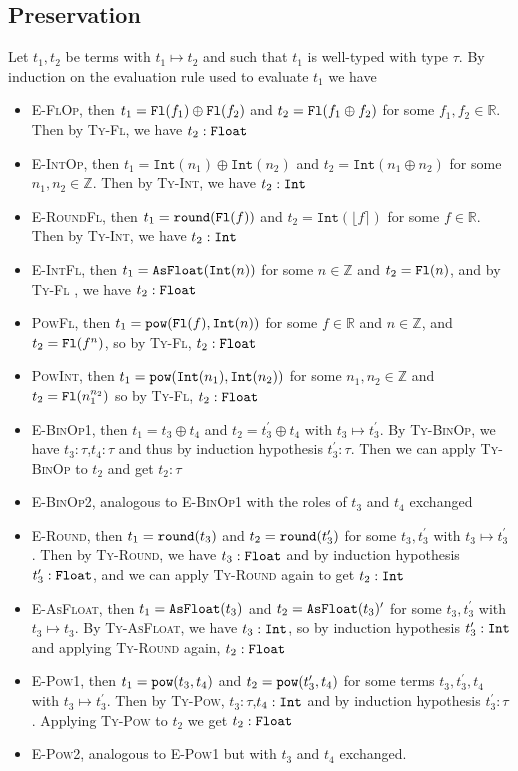 \documentclass{article}
\newcommand{\round}[1]{\ensuremath\mathtt{round}(#1)}
\newcommand{\fl}[1]{\ensuremath\mathtt{Fl}(#1)}
\newcommand{\nat}[1]{\ensuremath{\mathtt{Int}(#1)}}
\newcommand{\tofloat}[1]{\ensuremath\mathtt{AsFloat}(#1)}
\newcommand{\tyint}{\ensuremath\mathtt{Int}}
\newcommand{\tyfloat}{\ensuremath\mathtt{Float}}
\newcommand{\pow}[2]{\ensuremath\mathtt{pow}(#1,#2)}
\begin{document}
\subsection*{Preservation}
Let $t_1,t_2$ be terms with $t_1\mapsto t_2$ and such that $t_1$ is well-typed with type $\tau$. By induction on the evaluation rule used to evaluate $t_1$ we have 
\begin{itemize}
\item \textsc{E-FlOp}, then $t_1 = \fl{f_1} \oplus \fl{f_2}$ and $t_2 = \fl{f_1\oplus f_2}$ for some $f_1,f_2\in\mathbb{R}$. Then by \textsc{Ty-Fl}, we have $t_2:\tyfloat$
\item \textsc{E-IntOp}, then $t_1 = \nat{n_1} \oplus \nat{n_2}$ and $t_2 = \nat{n_1\oplus n_2}$ for some $n_1,n_2\in\mathbb{Z}$. Then by \textsc{Ty-Int}, we have $t_2:\tyint$
\item \textsc{E-RoundFl}, then $t_1 = \round{\fl{f}}$ and $t_2=\nat{\lfloor f \rceil}$ for some $f\in\mathbb{R}$. Then by \textsc{Ty-Int}, we have $t_2:\tyint$
\item \textsc{E-IntFl}, then $t_1 = \tofloat{\nat{n}}$ for some $n\in\mathbb{Z}$ and $t_2 = \fl{n}$, and by \textsc{Ty-Fl} , we have $t_2:\tyfloat$
\item \textsc{PowFl}, then $t_1 = \pow{\fl{f}}{\nat{n}}$  for some $f\in\mathbb{R}$ and $n\in\mathbb{Z}$, and $t_2=\fl{f^n}$, so by \textsc{Ty-Fl}, $t_2:\tyfloat$
\item \textsc{PowInt}, then $t_1 = \pow{\nat{n_1}}{\nat{n_2}}$ for some $n_1,n_2\in\mathbb{Z}$ and $t_2=\fl{n_1^{n_2}}$ so by \textsc{Ty-Fl}, $t_2:\tyfloat$
\item \textsc{E-BinOp1}, then $t_1 = t_3 \oplus t_4$ and $t_2 = t_3^{\prime} \oplus t_4$ with $t_3 \mapsto t_3^{\prime}$. By \textsc{Ty-BinOp}, we have $t_3:\tau$,$t_4:\tau$ and thus by induction hypothesis $t_3^{\prime}:\tau$. Then we can apply \textsc{Ty-BinOp} to $t_2$ and get $t_2:\tau$
\item \textsc{E-BinOp2}, analogous to \textsc{E-BinOp1} with the roles of $t_3$ and $t_4$ exchanged
\item \textsc{E-Round}, then $t_1 = \round{t_3}$ and $t_2 = \round{t_3^{\prime}}$ for some $t_3,t_3^{\prime}$ with $t_3 \mapsto t_3^{\prime}$. Then by \textsc{Ty-Round}, we have $t_3:\tyfloat$ and by induction hypothesis $t_3^{\prime}:\tyfloat$, and we can apply \textsc{Ty-Round} again to get $t_2:\tyint$
\item \textsc{E-AsFloat}, then $t_1 = \tofloat{t_3}$ and $t_2 = \tofloat{t_3}^{\prime}$ for some $t_3,t_3^{\prime}$ with $t_3 \mapsto t_3$. By \textsc{Ty-AsFloat}, we have $t_3:\tyint$, so by induction hypothesis $t_3^{\prime}:\tyint$ and applying \textsc{Ty-Round} again, $t_2:\tyfloat$
\item \textsc{E-Pow1}, then $t_1 = \pow{t_3}{t_4}$ and $t_2 = \pow{t_3^{\prime}}{t_4}$ for some terms $t_3,t_3^{\prime},t_4$ with $t_3 \mapsto t_3^{\prime}$. Then by \textsc{Ty-Pow}, $t_3:\tau$,$t_4:\tyint$ and by induction hypothesis $t_3^{\prime}:\tau$. Applying \textsc{Ty-Pow} to $t_2$ we get $t_2:\tyfloat$
\item \textsc{E-Pow2}, analogous to \textsc{E-Pow1} but with $t_3$ and $t_4$ exchanged.
\end{itemize}
\end{document}
